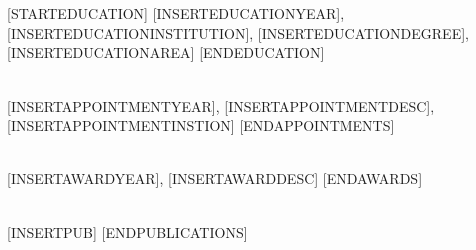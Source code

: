 \NameBoldface{\color{\NameColor}{\NameSize [INSERTNAME] ([INSERTROLE]):}}\\
[INSERTAFFILIATION]

\SectionSpacing
{}\\
[STARTEDUCATION]
[INSERTEDUCATIONYEAR], [INSERTEDUCATIONINSTITUTION], [INSERTEDUCATIONDEGREE], [INSERTEDUCATIONAREA]
[ENDEDUCATION]

\SectionSpacing
{}\\
[STARTAPPOINTMENTS]
[INSERTAPPOINTMENTYEAR], [INSERTAPPOINTMENTDESC], [INSERTAPPOINTMENTINSTION]
[ENDAPPOINTMENTS]

\SectionSpacing
{}\\
[STARTAWARDS]
[INSERTAWARDYEAR], [INSERTAWARDDESC]
[ENDAWARDS]

\SectionSpacing
{}\\
[STARTPUBLICATIONS]
{\PublicationBullet}[INSERTPUB]
[ENDPUBLICATIONS]

